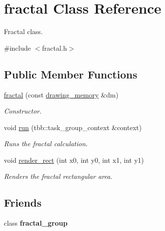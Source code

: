 \hypertarget{classfractal}{}\section{fractal Class Reference}
\label{classfractal}


Fractal class.  




{\ttfamily \#include $<$fractal.\+h$>$}

\subsection*{Public Member Functions}
\begin{DoxyCompactItemize}
\item 
\hypertarget{classfractal_a5870ad87aeb2ffbf34c70cab7ef1e564}{}\hyperlink{classfractal_a5870ad87aeb2ffbf34c70cab7ef1e564}{fractal} (const \hyperlink{classdrawing__memory}{drawing\+\_\+memory} \&dm)\label{classfractal_a5870ad87aeb2ffbf34c70cab7ef1e564}

\begin{DoxyCompactList}\small\item\em Constructor. \end{DoxyCompactList}\item 
\hypertarget{classfractal_ac6f861862b015c7ed766a24e11b94bef}{}void \hyperlink{classfractal_ac6f861862b015c7ed766a24e11b94bef}{run} (tbb\+::task\+\_\+group\+\_\+context \&context)\label{classfractal_ac6f861862b015c7ed766a24e11b94bef}

\begin{DoxyCompactList}\small\item\em Runs the fractal calculation. \end{DoxyCompactList}\item 
\hypertarget{classfractal_a438823f362fa609e11542f360fd49017}{}void \hyperlink{classfractal_a438823f362fa609e11542f360fd49017}{render\+\_\+rect} (int x0, int y0, int x1, int y1)\label{classfractal_a438823f362fa609e11542f360fd49017}

\begin{DoxyCompactList}\small\item\em Renders the fractal rectangular area. \end{DoxyCompactList}\end{DoxyCompactItemize}
\subsection*{Friends}
\begin{DoxyCompactItemize}
\item 
\hypertarget{classfractal_aeae1179c97bd992d6c342aa72b53d633}{}class {\bfseries fractal\+\_\+group}\label{classfractal_aeae1179c97bd992d6c342aa72b53d633}

\end{DoxyCompactItemize}


